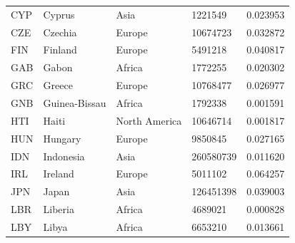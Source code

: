 \documentclass[11pt]{report}
\begin{document}
\begin{table}[h!]
\begin{tabular}{lllll}
            CYP                           & Cyprus                    & Asia                           & 1221549                       & 0.023953                           \\
            CZE                           & Czechia                   & Europe                         & 10674723                      & 0.032872                           \\
            FIN                           & Finland                   & Europe                         & 5491218                       & 0.040817                           \\
            GAB                           & Gabon                     & Africa                         & 1772255                       & 0.020302                           \\
            GRC                           & Greece                    & Europe                         & 10768477                      & 0.026977                           \\
            GNB                           & Guinea-Bissau             & Africa                         & 1792338                       & 0.001591                           \\
            HTI                           & Haiti                     & North America                  & 10646714                      & 0.001817                           \\
            HUN                           & Hungary                   & Europe                         & 9850845                       & 0.027165                           \\
            IDN                           & Indonesia                 & Asia                           & 260580739                     & 0.011620                           \\
            IRL                           & Ireland                   & Europe                         & 5011102                       & 0.064257                           \\
            JPN                           & Japan                     & Asia                           & 126451398                     & 0.039003                           \\
            LBR                           & Liberia                   & Africa                         & 4689021                       & 0.000828                           \\
            LBY                           & Libya                     & Africa                         & 6653210                       & 0.013661                           \\

\end{tabular}
\end{table}
\end{document}
